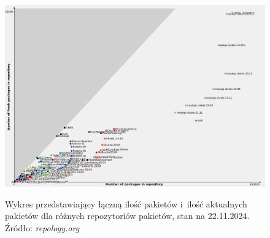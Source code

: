 \begin{figure}[!h]
	\begin{center}
		\resizebox{0.9\textwidth}{!} {
			\includegraphics{img/4/repo.png}
		}
		\caption[Ilość aktualnych pakietów i~łączna ilość pakietów w~repozytoriach]{Wykres przedstawiający łączną ilość pakietów i~ilość aktualnych pakietów dla różnych repozytoriów pakietów, stan na 22.11.2024. Źródło: \textit{repology.org}}
		\label{wykresRepo}
	\end{center}
\end{figure}
